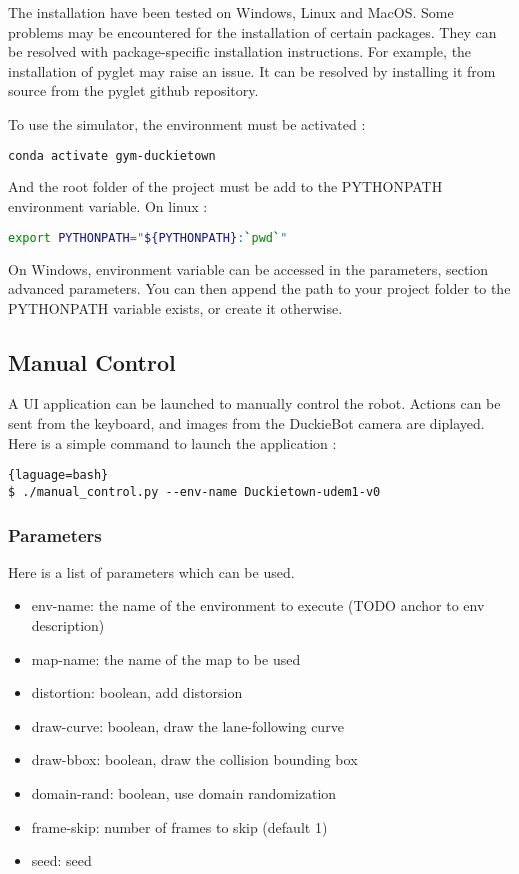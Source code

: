 \documentclass[12pt]{article}
\begin{document}
The installation have been tested on Windows, Linux and MacOS. Some problems may be encountered for the installation of certain packages. They can be resolved with package-specific installation instructions. 
For example, the installation of pyglet may raise an issue. It can be resolved by installing it from source from the pyglet github repository. 

To use the simulator, the environment must be activated :
 
\begin{lstlisting}[language=bash]
    conda activate gym-duckietown
\end{lstlisting}

And the root folder of the project must be add to the PYTHONPATH environment variable.
On linux :
\begin{lstlisting}[language=bash]
    export PYTHONPATH="${PYTHONPATH}:`pwd`"
\end{lstlisting}

On Windows, environment variable can be accessed in the parameters, section advanced parameters. You can then append the path to your project folder to the PYTHONPATH variable exists, or create it otherwise.


\subsection{Manual Control}
A UI application can be launched to manually control the robot. Actions can be sent from the keyboard, and images from the DuckieBot camera are diplayed. Here is a simple command to launch the application :

\begin{lstlisting}{laguage=bash}
$ ./manual_control.py --env-name Duckietown-udem1-v0
\end{lstlisting}

\subsubsection{Parameters}
Here is a list of parameters which can be used. 

\begin{itemize}
	\item env-name: the name of the environment to execute (TODO anchor to env description)
	\item map-name: the name of the map to be used
	\item distortion: boolean, add distorsion
	\item draw-curve: boolean, draw the lane-following curve
	\item draw-bbox: boolean, draw the collision bounding box
	\item domain-rand: boolean, use domain randomization
	\item frame-skip: number of frames to skip (default 1)
	\item seed: seed
\end{itemize}
\end{document}
